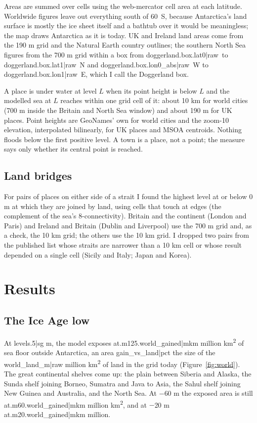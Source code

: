 \documentclass[11pt,a4paper]{article}
\begin{document}
Areas are summed over cells using the web-mercator cell area at each latitude. Worldwide figures leave out everything south of 60\textdegree\ S, because Antarctica's land surface is mostly the ice sheet itself and a bathtub over it would be meaningless; the map draws Antarctica as it is today. UK and Ireland land areas come from the 190 m grid and the Natural Earth country outlines; the southern North Sea figures from the 700 m grid within a box from {{doggerland.box.lat0|raw}}\textdegree\ to {{doggerland.box.lat1|raw}}\textdegree\ N and {{doggerland.box.lon0_abs|raw}}\textdegree\ W to {{doggerland.box.lon1|raw}}\textdegree\ E, which I call the Doggerland box.

A place is under water at level $L$ when its point height is below $L$ and the modelled sea at $L$ reaches within one grid cell of it: about 10 km for world cities (700 m inside the Britain and North Sea window) and about 190 m for UK places. Point heights are GeoNames' own for world cities and the zoom-10 elevation, interpolated bilinearly, for UK places and MSOA centroids. Nothing floods below the first positive level. A town is a place, not a point; the measure says only whether its central point is reached.

\subsection{Land bridges}

For pairs of places on either side of a strait I found the highest level at or below 0 m at which they are joined by land, using cells that touch at edges (the complement of the sea's 8-connectivity). Britain and the continent (London and Paris) and Ireland and Britain (Dublin and Liverpool) use the 700 m grid and, as a check, the 10 km grid; the others use the 10 km grid. I dropped two pairs from the published list whose straits are narrower than a 10 km cell or whose result depended on a single cell (Sicily and Italy; Japan and Korea).

\section{Results}

\subsection{The Ice Age low}

At {{levels.5|sg}} m, the model exposes {{at.m125.world_gained|mkm}} million km\textsuperscript{2} of sea floor outside Antarctica, an area {{gain_vs_land|pct}} the size of the {{world_land_m|raw}} million km\textsuperscript{2} of land in the grid today (Figure~\ref{fig:world}). The great continental shelves come up: the plain between Siberia and Alaska, the Sunda shelf joining Borneo, Sumatra and Java to Asia, the Sahul shelf joining New Guinea and Australia, and the North Sea. At $-$60 m the exposed area is still {{at.m60.world_gained|mkm}} million km\textsuperscript{2}, and at $-$20 m {{at.m20.world_gained|mkm}} million.
\end{document}
